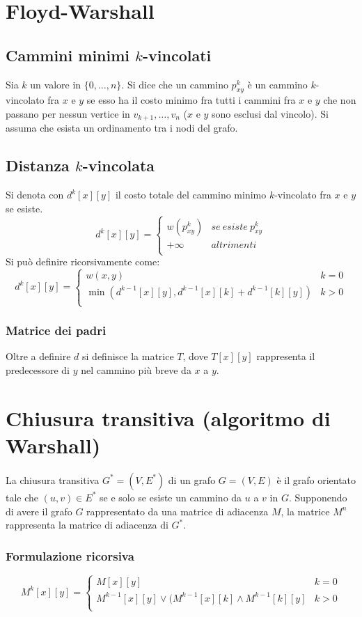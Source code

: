 \section{Floyd-Warshall}
	\subsection{Cammini minimi $k$-vincolati}
	Sia $k$ un valore in $\{0, \dots, n\}$. Si dice che un cammino $p^k_{xy}$ \`e un cammino
	$k$-vincolato fra $x$ e $y$ se esso ha il costo minimo fra tutti i cammini fra $x$ e $y$ che non
	passano per nessun vertice in $v_{k+1}, \dots, v_n$ ($x$ e $y$ sono esclusi dal vincolo). Si assuma
	che esista un ordinamento tra i nodi del grafo.
	\subsection{Distanza $k$-vincolata}
	Si denota con $d^k[x][y]$ il costo totale del cammino minimo $k$-vincolato fra $x$ e $y$ se esiste.
	$$ d^k[x][y] = \begin{cases}
			w(p^k_{xy}) & se\ esiste\ p^k_{xy} \\
			+\infty     & altrimenti           \\
		\end{cases}$$
	Si pu\`o definire ricorsivamente come:
	$$ d^k[x][y] = \begin{cases}
			w(x, y)                                          & k = 0 \\
			\min(d^{k-1}[x][y], d^{k-1}[x][k]+d^{k-1}[k][y]) & k>0   \\
		\end{cases}$$
	\subsubsection{Matrice dei padri}
	Oltre a definire $d$ si definisce la matrice $T$, dove $T[x][y]$ rappresenta il predecessore di $y$
	nel cammino pi\`u breve da $x$ a $y$.\\ 
	\section{Chiusura transitiva (algoritmo di Warshall)}
	La chiusura transitiva $G^* = (V, E^*)$ di un grafo $G = (V, E)$ \`e il grafo orientato tale che
	$(u, v)\in E^*$ se e solo se esiste un cammino da $u$ a $v$ in $G$. Supponendo di avere il grafo
	$G$ rappresentato da una matrice di adiacenza $M$, la matrice $M^n$ rappresenta la matrice di
	adiacenza di $G^*$.
	\subsubsection{Formulazione ricorsiva}
	$$M^k[x][y] = \begin{cases}
			M[x][y]                                             & k = 0 \\
			M^{k-1}[x][y]\lor (M^{k-1}[x][k]\land M^{k-1}[k][y] & k>0   \\
		\end{cases}$$